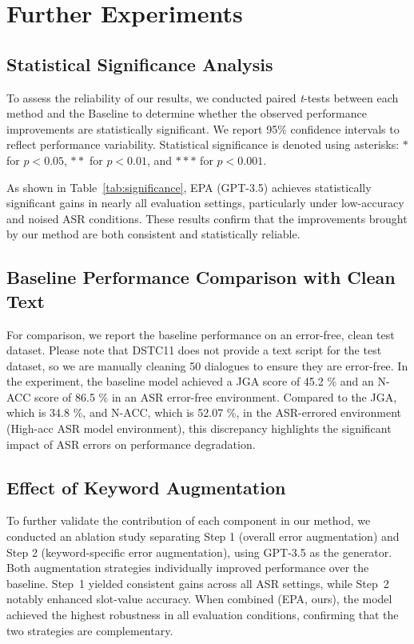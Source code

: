 \section{Further Experiments}
\label{app:exp_main}



\subsection{Statistical Significance Analysis}

To assess the reliability of our results, we conducted paired \textit{t}-tests between each method and the Baseline to determine whether the observed performance improvements are statistically significant. We report 95\% confidence intervals to reflect performance variability. Statistical significance is denoted using asterisks: $\ast$ for $p < 0.05$, $\ast\ast$ for $p < 0.01$, and $\ast\ast\ast$ for $p < 0.001$.

As shown in Table~\ref{tab:significance}, EPA (GPT-3.5) achieves statistically significant gains in nearly all evaluation settings, particularly under low-accuracy and noised ASR conditions. These results confirm that the improvements brought by our method are both consistent and statistically reliable.



\subsection{Baseline Performance Comparison with Clean Text }
For comparison, we report the baseline performance on an error-free, clean test dataset. Please note that DSTC11 \cite{dstc11} does not provide a text script for the test dataset, so we are manually cleaning 50 dialogues to ensure they are error-free. In the experiment, the baseline model achieved a JGA score of 45.2 \% and an N-ACC score of 86.5 \% in an ASR error-free environment. Compared to the JGA, which is 34.8 \%, and N-ACC, which is 52.07 \%, in the ASR-errored environment (High-acc ASR model environment), this discrepancy highlights the significant impact of ASR errors on performance degradation.



 
\subsection{Effect of Keyword Augmentation}

To further validate the contribution of each component in our method, we conducted an ablation study separating Step 1 (overall error augmentation) and Step 2 (keyword-specific error augmentation), using GPT-3.5 as the generator. Both augmentation strategies individually improved performance over the baseline. 
Step~1 yielded consistent gains across all ASR settings, while Step~2 notably enhanced slot-value accuracy. When combined (EPA, ours), the model achieved the highest robustness in all evaluation conditions, confirming that the two strategies are complementary.




